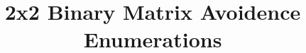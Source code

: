 \documentclass[]{article}
\begin{document}
     \title{2x2 Binary Matrix Avoidence Enumerations}
     \maketitle





\end{document}
